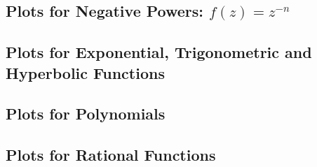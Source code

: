 \documentclass[12pt]{article}
\begin{document}




\subsection{Plots for Negative Powers: $f(z) = z^{-n}$}




\subsection{Plots for Exponential, Trigonometric and Hyperbolic Functions}

\subsection{Plots for Polynomials}

\subsection{Plots for Rational Functions}


\end{document}

